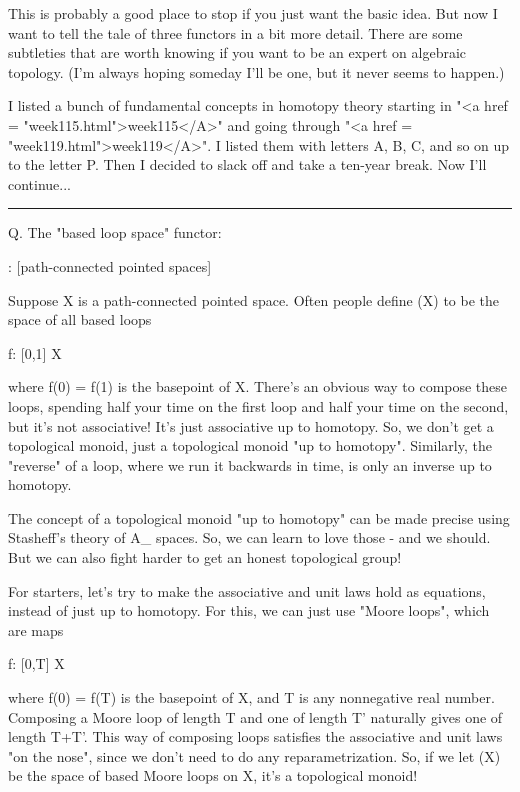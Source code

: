 This is probably a good place to stop if you just want the basic
idea.  But now I want to tell the tale of three functors in a bit
more detail.  There are some subtleties that are worth knowing if 
you want to be an expert on algebraic topology.  (I'm always hoping
someday I'll be one, but it never seems to happen.)

I listed a bunch of fundamental concepts in homotopy theory starting
in "<a href = "week115.html">week115</A>" and going through
"<a href = "week119.html">week119</A>".  I listed them with
letters A, B, C, and so on up to the letter P.  Then I decided to slack
off and take a ten-year break.  Now I'll continue...

\par\noindent\rule{\textwidth}{0.4pt}
Q.  The "based loop space" functor:

\Omega : [path-connected pointed spaces] 

Suppose X is a path-connected pointed space.  Often people define
\Omega (X) to be the space of all based loops

f: [0,1] \to  X

where f(0) = f(1) is the basepoint of X.  There's an obvious way to
compose these loops, spending half your time on the first loop and
half your time on the second, but it's not associative!  It's just
associative up to homotopy.  So, we don't get a topological monoid,
just a topological monoid "up to homotopy".  Similarly, the "reverse"
of a loop, where we run it backwards in time, is only an inverse up to
homotopy.

The concept of a topological monoid "up to homotopy" can be made
precise using Stasheff's theory of A_{\infty } spaces.  So, we can
learn to love those - and we should.  But we can also fight harder to
get an honest topological group!

For starters, let's try to make the associative and unit laws hold as
equations, instead of just up to homotopy.  For this, we can just use
"Moore loops", which are maps

f: [0,T] \to  X 

where f(0) = f(T) is the basepoint of X, and T is any nonnegative real
number.  Composing a Moore loop of length T and one of length T'
naturally gives one of length T+T'.  This way of composing loops
satisfies the associative and unit laws "on the nose", since we don't
need to do any reparametrization.  So, if we let \Omega (X) be the space
of based Moore loops on X, it's a topological monoid!

